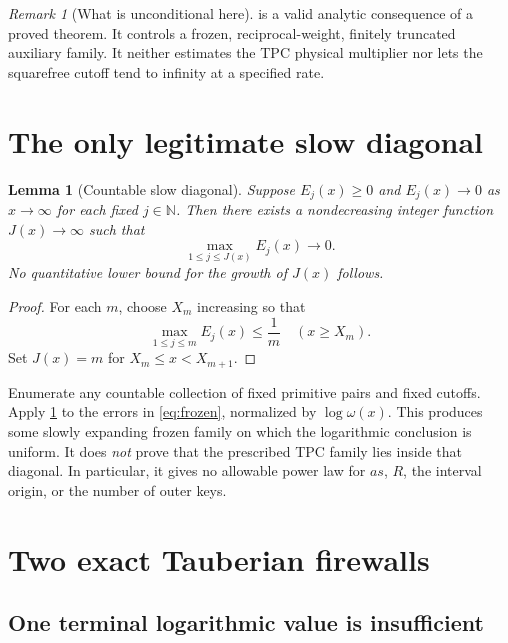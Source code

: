 \documentclass[11pt]{article}
\newtheorem{lemma}[theorem]{Lemma}
\theoremstyle{definition}
\theoremstyle{remark}
\newtheorem{remark}[theorem]{Remark}
\begin{document}
\begin{remark}[What is unconditional here]
 is a valid analytic consequence of a proved
theorem.  It controls a frozen, reciprocal-weight, finitely truncated
auxiliary family.  It neither estimates the TPC physical multiplier
nor lets the squarefree cutoff tend to infinity at a specified rate.
\end{remark}

\section{The only legitimate slow diagonal}

\begin{lemma}[Countable slow diagonal]
\label{lem:diagonal}
Suppose \(E_j(x)\ge0\) and \(E_j(x)\to0\) as \(x\to\infty\) for each
fixed \(j\in\mathbb N\).  Then there exists a nondecreasing integer
function \(J(x)\to\infty\) such that
\begin{equation}
 \max_{1\le j\le J(x)}E_j(x)\longrightarrow0.
\label{eq:slow-diagonal}
\end{equation}
No quantitative lower bound for the growth of \(J(x)\) follows.
\end{lemma}

\begin{proof}
For each \(m\), choose \(X_m\) increasing so that
\[
 \max_{1\le j\le m}E_j(x)\le\frac1m
 \quad(x\ge X_m).
\]
Set \(J(x)=m\) for \(X_m\le x<X_{m+1}\).
\end{proof}

Enumerate any countable collection of fixed primitive pairs and
fixed cutoffs.  Apply \cref{lem:diagonal} to the errors in
\eqref{eq:frozen}, normalized by \(\log\omega(x)\).  This produces
some slowly expanding frozen family on which the logarithmic
conclusion is uniform.  It does \emph{not} prove that the prescribed
TPC family lies inside that diagonal.  In particular, it gives no
allowable power law for \(as\), \(R\), the interval origin, or the
number of outer keys.

\section{Two exact Tauberian firewalls}

\subsection{One terminal logarithmic value is insufficient}
\end{document}

